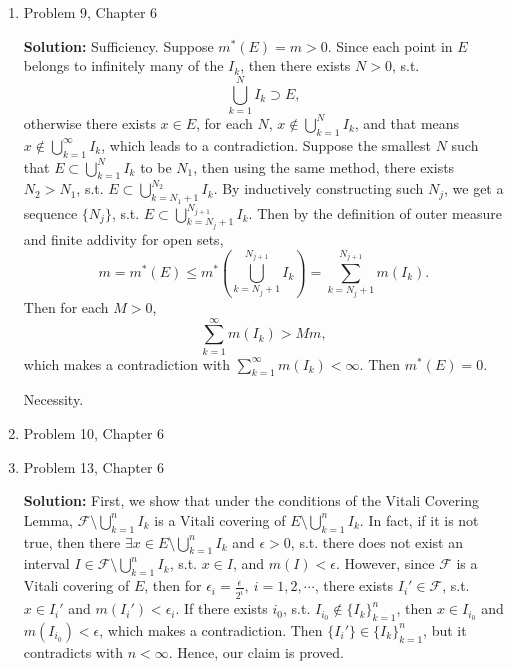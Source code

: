 \documentclass{article}%
\begin{document}
\begin{enumerate}
\item  Problem 9,  Chapter 6 

\smallskip
\textbf{Solution:}
\smallskip
Sufficiency. Suppose $m^*(E) = m > 0$. Since each point in $E$ belongs to infinitely many of the $I_k $, then there exists $N > 0$, s.t. 
$$
\bigcup_{k=1}^N I_k\supset E,
$$
otherwise there exists $x\in E$, for each $N$, $x\notin \bigcup\limits_{k=1}^N I_k $, and that means $x\notin \bigcup\limits_{k=1}^{\infty}I_k $, which leads to a contradiction. Suppose the smallest $N$ such that $E \subset \bigcup\limits_{k=1}^N I_k$ to be $N_1 $, then using the same method, there exists $N_2 > N_1 $, s.t. $E \subset \bigcup\limits_{k=N_1+1}^{N_2} I_k$. By inductively constructing such $N_j $, we get a sequence $\{N_j\}$, s.t. $E \subset \bigcup\limits_{k=N_j+1}^{N_{j+1}} I_k $. Then by the definition of outer measure and finite addivity for open sets, 
$$
m = m^*(E) \le m^*(\bigcup\limits_{k=N_j+1}^{N_{j+1}}I_k) = \sum_{k = N_j+1}^{N_{j+1}}m(I_k).
$$
Then for each $M > 0$,
$$
\sum_{k=1}^{\infty}m(I_k) > Mm, 
$$
which makes a contradiction with $\sum_{k=1}^{\infty}m(I_k) < \infty$. Then $m^*(E) = 0$.

Necessity.


\bigskip
\item  Problem 10, Chapter 6
\item  Problem 13, Chapter 6

\smallskip
\textbf{Solution:}
\smallskip
First, we show that under the conditions of the Vitali Covering Lemma, $\mathcal{F}\setminus \bigcup\limits_{k=1}^n I_k $ is a Vitali covering of $E\setminus \bigcup\limits_{k=1}^n I_k$. In fact, if it is not true, then there $\exists x\in E\setminus\bigcup\limits_{k=1}^n I_k$ and $\epsilon > 0$, s.t. there does not exist an interval $I\in\mathcal{F}\setminus\bigcup\limits_{k=1}^n I_k$, s.t. $x\in I$, and $m(I) < \epsilon$. However, since $\mathcal{F}$ is a Vitali covering of $E$, then for $\epsilon_i = \frac{\epsilon}{2^i}, ~i = 1, 2, \cdots $, there exists $I_i'\in\mathcal{F} $, s.t. $x\in I_i' $ and $m(I_i') < \epsilon_i $. If there exists $i_0 $, s.t. $I_{i_0}\notin \{I_k\}_{k = 1}^{n} $, then $x\in I_{i_0} $ and $m(I_{i_0}) < \epsilon$, which makes a contradiction. Then $\{I_i'\} \in \{I_k\}_{k = 1}^{n}$, but it contradicts with $n < \infty$. Hence, our claim is proved.


\end{enumerate}
\end{document}
